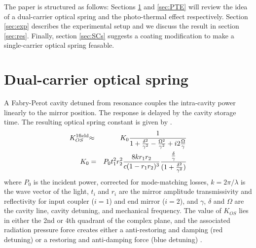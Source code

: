 

The paper is structured as follows: Sections \ref{sec:DCOS} and \ref{sec:PTE} will review the idea of a dual-carrier optical spring and the photo-thermal effect respectively. 
Section \ref{sec:exp} describes the experimental setup and we discuss the result in section \ref{sec:res}. Finally, section \ref{sec:SCs} suggests a coating modification to make a single-carrier optical spring feasable.


\section{Dual-carrier optical spring}
\label{sec:DCOS}
A Fabry-Perot cavity detuned from resonance couples the intra-cavity power linearly to the mirror position. The response is delayed by the cavity storage time. The resulting optical spring constant is given by \cite{Perreca14}.
\begin{eqnarray}
\label{eq:KOS1}
K_{OS}^{\rm 1 field} & {\approx} & K_0
\frac{1}{1+\frac{\delta^2}{\gamma^2}-\frac{\Omega^2}{\gamma^2}+i2\frac{\Omega}{\gamma} } \\
K_0 &= & P_0 t_1^2 r_2^2 \frac{8k r_1r_2}{c(1-r_1r_2)^3}\frac{ \frac{\delta}{\gamma}}{(1+\frac{\delta^2}{\gamma^2})} 
\end{eqnarray}
where $P_0$ is the incident power, corrected for mode-matching losses, $k = {2\pi}/{\lambda}$ is the wave vector of the light, $t_i$ and $r_i$ are the mirror amplitude transmissivity and reflectivity for input coupler ($i=1$) and end mirror ($i=2$), and $\gamma$, $\delta$ and $\Omega$ are the cavity line, cavity detuning, and mechanical frequency. The value of $K_{OS}$ lies in either the 2nd or 4th quadrant of the complex plane, and the associated radiation pressure force creates either
a anti-restoring and damping (red detuning) or
a restoring and anti-damping force (blue detuning) \cite{Sheard04}. 

